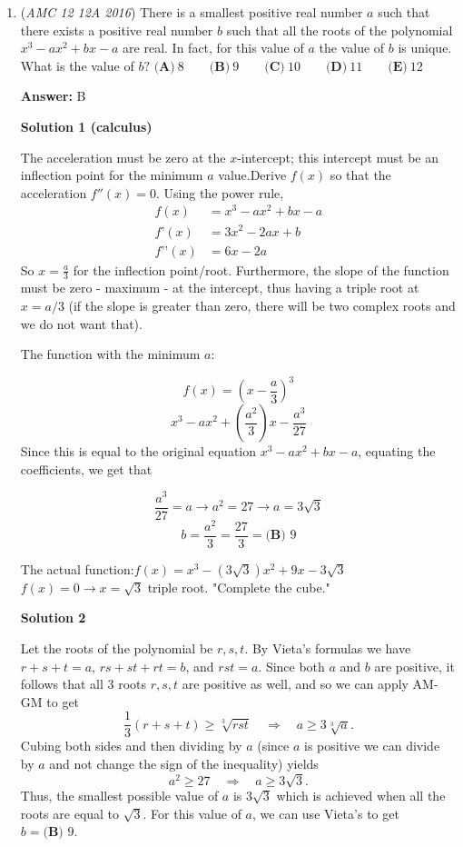 \begin{enumerate}
 


	\item (\textit{AMC 12 12A 2016}) There is a smallest positive real number $a$ such that there exists a positive real number $b$ such that all the roots of the polynomial $x^3-ax^2+bx-a$ are real. In fact, for this value of $a$ the value of $b$ is unique. What is the value of $b?$
$\textbf{(A)}\ 8\qquad\textbf{(B)}\ 9\qquad\textbf{(C)}\ 10\qquad\textbf{(D)}\ 11\qquad\textbf{(E)}\ 12$

 \textbf{Answer: }B



\textbf{Solution 1 (calculus)}

The acceleration must be zero at the $x$-intercept; this intercept must be an inflection point for the minimum $a$ value.Derive $f(x)$ so that the acceleration $f''(x)=0$. Using the power rule,
 \begin{align*} f(x) &= x^3-ax^2+bx-a \\ f’(x) &= 3x^2-2ax+b \\  f’’(x) &= 6x-2a \end{align*}
So $x=\frac{a}{3}$ for the inflection point/root. Furthermore, the slope of the function must be zero - maximum - at the intercept, thus having a triple root at $x=a/3$ (if the slope is greater than zero, there will be two complex roots and we do not want that).

 The function with the minimum $a$:

 
 \[f(x)=\left(x-\frac{a}{3}\right)^3\]
 \[x^3-ax^2+\left(\frac{a^2}{3}\right)x-\frac{a^3}{27}\]Since this is equal to the original equation $x^3-ax^2+bx-a$, equating the coefficients, we get that

 
 \[\frac{a^3}{27}=a\rightarrow a^2=27\rightarrow a=3\sqrt{3}\]
 \[b=\frac{a^2}{3}=\frac{27}{3}=\boxed{\textbf{(B) }9}\]

 The actual function:$f(x)=x^3-\left(3\sqrt{3}\right)x^2+9x-3\sqrt{3}$
$f(x)=0\rightarrow x=\sqrt{3}$ triple root. "Complete the cube."

 



\textbf{Solution 2}

Let the roots of the polynomial be $r, s, t$. By Vieta's formulas we have $r+s+t=a$, $rs+st+rt=b$, and $rst=a$. Since both $a$ and $b$ are positive, it follows that all 3 roots $r, s, t$ are positive as well, and so we can apply AM-GM to get 
 \[\frac 13 (r+s+t) \ge \sqrt[3]{rst} \quad \Rightarrow \quad a \ge 3\sqrt[3]{a}.\] Cubing both sides and then dividing by $a$ (since $a$ is positive we can divide by $a$ and not change the sign of the inequality) yields 
 \[a^2 \ge 27 \quad \Rightarrow \quad a \ge  3\sqrt{3}.\]Thus, the smallest possible value of $a$ is $3\sqrt{3}$ which is achieved when all the roots are equal to $\sqrt{3}$. For this value of $a$, we can use Vieta's to get $b=\boxed{\textbf{(B) }9}$.


\end{enumerate}
